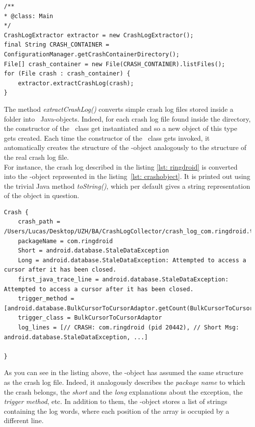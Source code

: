 \begin{lstlisting}[caption=\Extractor\ code snippet converting crash files into CrashLog objects,label={lst: extractor}]
/**
* @class: Main
*/
CrashLogExtractor extractor = new CrashLogExtractor();
final String CRASH_CONTAINER = ConfigurationManager.getCrashContainerDirectory();
File[] crash_container = new File(CRASH_CONTAINER).listFiles();
for (File crash : crash_container) {
	extractor.extractCrashLog(crash);
}
\end{lstlisting} 
The method \textit{extractCrashLog()} converts simple crash log files stored inside a folder into \Crash\ Java-objects. 
Indeed, for each crash log file found inside the directory, the constructor of the \Crash\ class get instantiated and so a new object of this type gets created. Each time the constructor of the \Crash\ class gets invoked, it automatically creates the structure of the \Crash-object analogously to the structure of the real crash log file. \\
For instance, the crash log described in the listing \ref{lst: ringdroid} is converted into the \Crash-object represented in the listing~\ref{lst: crashobject}.
It is printed out using the trivial Java method \textit{toString()}, which  per default gives a string representation of the object in question.  

\begin{lstlisting}[caption=\Crash-object,basicstyle=\fontsize{6}{8}\ttfamily, label={lst: crashobject}]
Crash {
	crash_path = /Users/Lucas/Desktop/UZH/BA/CrashLogCollector/crash_log_com.ringdroid.txt
	packageName = com.ringdroid
	Short = android.database.StaleDataException
	Long = android.database.StaleDataException: Attempted to access a cursor after it has been closed.
	first_java_trace_line = android.database.StaleDataException: Attempted to access a cursor after it has been closed.
	trigger_method = [android.database.BulkCursorToCursorAdaptor.getCount(BulkCursorToCursorAdaptor.java:70)]
	trigger_class = BulkCursorToCursorAdaptor
	log_lines = [// CRASH: com.ringdroid (pid 20442), // Short Msg: android.database.StaleDataException, ...]
	
}
\end{lstlisting}
As you can see in the listing above, the \Crash-object has assumed the same structure as the crash log file. Indeed, it analogously describes the \textit{package name} to which the crash belongs, the \textit{short} and the \textit{long} explanations about the exception, the \textit{trigger method}, etc.
In addition to them, the \Crash-object stores a list of strings containing the log words, where each position of the array is occupied by a different line. 
